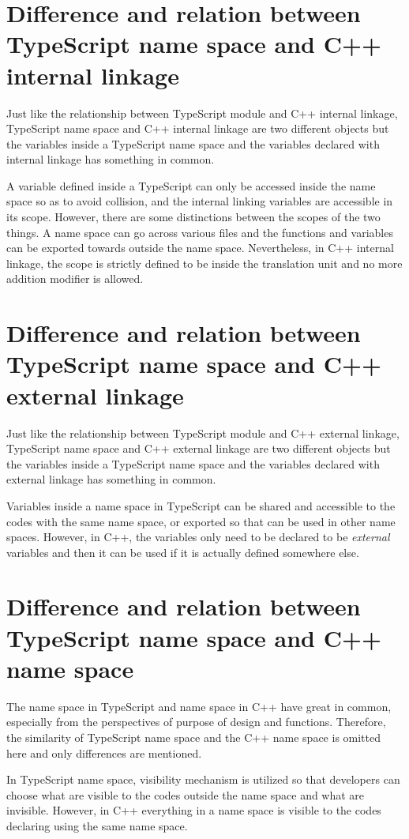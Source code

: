 \documentclass[a4paper]{report}
\begin{document}
\section{Difference and relation between TypeScript name space and C++ internal linkage}
Just like the relationship between TypeScript module and C++ internal linkage, TypeScript name space and C++ internal linkage are two different objects but the variables inside a TypeScript name space and the variables declared with internal linkage has something in common.
\par
A variable defined inside a TypeScript can only be accessed inside the name space so as to avoid collision, and the internal linking variables are accessible in its scope. However, there are some distinctions between the scopes of the two things. A name space can go across various files and the functions and variables can be exported towards outside the name space. Nevertheless, in C++ internal linkage, the scope is strictly defined to be inside the translation unit and no more addition modifier is allowed.
\section{Difference and relation between TypeScript name space and C++ external linkage}
Just like the relationship between TypeScript module and C++ external linkage, TypeScript name space and C++ external linkage are two different objects but the variables inside a TypeScript name space and the variables declared with external linkage has something in common.
\par
Variables inside a name space in TypeScript can be shared and accessible to the codes with the same name space, or exported so that can be used in other name spaces. However, in C++, the variables only need to be declared to be \emph{external} variables and then it can be used if it is actually defined somewhere else. 
\section{Difference and relation between TypeScript name space and C++ name space}
The name space in TypeScript and name space in C++ have great in common, especially from the perspectives of purpose of design and functions. Therefore, the similarity of TypeScript name space and the C++ name space is omitted here and only differences are mentioned.
\par
In TypeScript name space, visibility mechanism is utilized so that developers can choose what are visible to the codes outside the name space and what are invisible. However, in C++ everything in a name space is visible to the codes declaring using the same name space.
\end{document}
